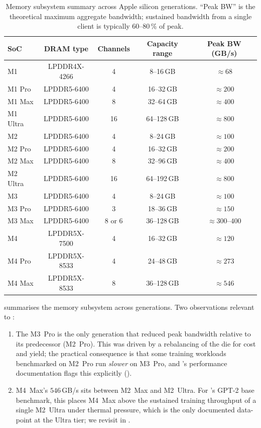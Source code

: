 \begin{table}[t]
\centering
\small
\begin{tabular}{lcccc}
\toprule
SoC & DRAM type & Channels & Capacity range & Peak BW (GB/s) \\
\midrule
M1        & LPDDR4X-4266 & 4  & 8--16\,GB     & $\approx 68$    \\
M1 Pro    & LPDDR5-6400  & 4  & 16--32\,GB    & $\approx 200$   \\
M1 Max    & LPDDR5-6400  & 8  & 32--64\,GB    & $\approx 400$   \\
M1 Ultra  & LPDDR5-6400  & 16 & 64--128\,GB   & $\approx 800$   \\
\midrule
M2        & LPDDR5-6400  & 4  & 8--24\,GB     & $\approx 100$   \\
M2 Pro    & LPDDR5-6400  & 4  & 16--32\,GB    & $\approx 200$   \\
M2 Max    & LPDDR5-6400  & 8  & 32--96\,GB    & $\approx 400$   \\
M2 Ultra  & LPDDR5-6400  & 16 & 64--192\,GB   & $\approx 800$   \\
\midrule
M3        & LPDDR5-6400  & 4  & 8--24\,GB     & $\approx 100$   \\
M3 Pro    & LPDDR5-6400  & 3  & 18--36\,GB    & $\approx 150$   \\
M3 Max    & LPDDR5-6400  & 8 or 6 & 36--128\,GB & $\approx 300$--$400$ \\
\midrule
M4        & LPDDR5X-7500 & 4  & 16--32\,GB    & $\approx 120$   \\
M4 Pro    & LPDDR5X-8533 & 4  & 24--48\,GB    & $\approx 273$   \\
M4 Max    & LPDDR5X-8533 & 8  & 36--128\,GB   & $\approx 546$   \\
\bottomrule
\end{tabular}
\caption[Apple silicon memory subsystem summary.]{Memory subsystem
summary across Apple silicon generations. ``Peak BW'' is the
theoretical maximum aggregate bandwidth; sustained bandwidth from a
single client is typically $60$--$80\,\%$ of peak.}
\label{tab:apple_silicon_memory}
\end{table}

 summarises the memory subsystem
across generations. Two observations relevant to \Lucid:

\begin{enumerate}
  \item The M3~Pro is the only generation that reduced peak bandwidth
    relative to its predecessor (M2~Pro). This was driven by a
    rebalancing of the die for cost and yield; the practical
    consequence is that some training workloads benchmarked on
    M2~Pro run \emph{slower} on M3~Pro, and \Lucid's performance
    documentation flags this explicitly
    ().
  \item M4~Max's $546$\,GB/s sits between M2~Max and M2~Ultra. For
    \Lucid's GPT-2 base benchmark, this places M4~Max above the
    sustained training throughput of a single M2~Ultra under thermal
    pressure, which is the only documented data-point at the Ultra
    tier; we revisit in .
\end{enumerate}

